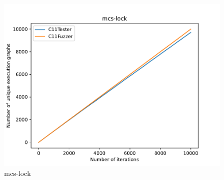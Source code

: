 \begin{figure}[H]
	\begin{minipage}{0.45\textwidth}
		\centering
		\includegraphics[width=\textwidth]{figure/mcs-lock.pdf}
		\caption{mcs-lock}
		\label{cover-plot1-mcs-lock}
	\end{minipage}
	\hfill
	\begin{minipage}{0.45\textwidth}
		\centering
	\end{minipage}



\end{figure}


